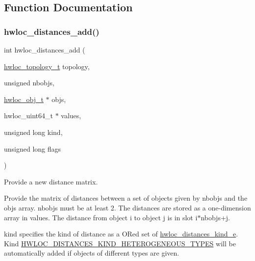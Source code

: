 \subsection{Function Documentation}
\mbox{\label{a00210_gac5a71d96cd86efe31d6f8d282aae3d97}} 
\subsubsection{\texorpdfstring{hwloc\+\_\+distances\+\_\+add()}{hwloc\_distances\_add()}}
{\footnotesize\ttfamily int hwloc\+\_\+distances\+\_\+add (\begin{DoxyParamCaption}\item[{\hyperlink{a00186_ga9d1e76ee15a7dee158b786c30b6a6e38}{hwloc\+\_\+topology\+\_\+t}}]{topology,  }\item[{unsigned}]{nbobjs,  }\item[{\hyperlink{a00185_ga79b8ab56877ef99ac59b833203391c7d}{hwloc\+\_\+obj\+\_\+t} $\ast$}]{objs,  }\item[{hwloc\+\_\+uint64\+\_\+t $\ast$}]{values,  }\item[{unsigned long}]{kind,  }\item[{unsigned long}]{flags }\end{DoxyParamCaption})}



Provide a new distance matrix. 

Provide the matrix of distances between a set of objects given by {\ttfamily nbobjs} and the {\ttfamily objs} array. {\ttfamily nbobjs} must be at least 2. The distances are stored as a one-\/dimension array in {\ttfamily values}. The distance from object i to object j is in slot i$\ast$nbobjs+j.

{\ttfamily kind} specifies the kind of distance as a OR\textquotesingle{}ed set of \hyperlink{a00208_gab1bb10d3adb85b52cdc6fe5a7f74f108}{hwloc\+\_\+distances\+\_\+kind\+\_\+e}. Kind \hyperlink{a00208_ggab1bb10d3adb85b52cdc6fe5a7f74f108aa6cf2b6dfcf148b65952f811814efbe1}{H\+W\+L\+O\+C\+\_\+\+D\+I\+S\+T\+A\+N\+C\+E\+S\+\_\+\+K\+I\+N\+D\+\_\+\+H\+E\+T\+E\+R\+O\+G\+E\+N\+E\+O\+U\+S\+\_\+\+T\+Y\+P\+ES} will be automatically added if objects of different types are given.

